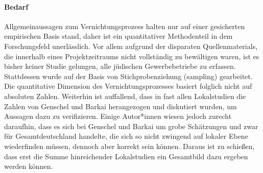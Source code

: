 \paragraph{Bedarf} 

Allgemeinaussagen zum Vernichtungsprozess halten nur auf einer gesicherten empirischen Basis stand, daher ist ein quantitativer Methodenteil in dem Forschungsfeld unerlässlich. Vor allem aufgrund der disparaten Quellenmaterials, die innerhalb eines Projektzeitraums nicht vollständig zu bewältigen waren, ist es bisher keiner Studie gelungen, alle jüdischen Gewerbebetriebe zu erfassen. Stattdessen wurde auf der Basis von Stichprobenziehung (sampling) gearbeitet. Die quantitative Dimension des Vernichtungsprozesses basiert folglich nicht auf absoluten Zahlen.
Weiterhin ist auffallend, dass in fast allen Lokalstudien die Zahlen von Genschel und Barkai herangezogen und diskutiert wurden, um Aussagen dazu zu verifizieren. Einige Autor*innen wiesen jedoch zurecht daraufhin, dass es sich bei Genschel und Barkai um grobe Schätzungen und zwar für Gesamtdeutschland handelte, die sich so nicht zwingend auf lokaler Ebene wiederfinden müssen, dennoch aber korrekt sein können. Daraus ist zu schießen, dass erst die Summe hinreichender Lokalstudien ein Gesamtbild dazu ergeben werden können. 



